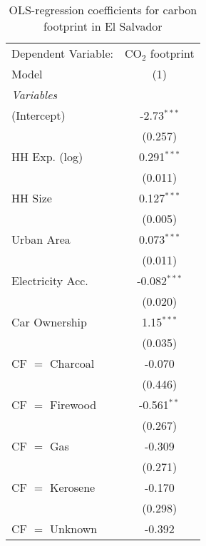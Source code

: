 
\begin{table}[htbp!]
   \centering
   \small
   \begin{adjustbox}{width = 1\textwidth, max height = 0.95\textheight, center}
      \begin{threeparttable}[b]
         \caption{\label{tab:OLS_2_SLV} OLS-regression coefficients for carbon footprint in El Salvador}
         \begin{tabular}{lc}
            \tabularnewline \midrule \midrule
            Dependent Variable: & CO$_{2}$ footprint\\  
            Model               & (1)\\  
            \midrule
            \emph{Variables}\\
            (Intercept)         & -2.73$^{***}$\\   
                                & (0.257)\\   
            HH Exp. (log)       & 0.291$^{***}$\\   
                                & (0.011)\\   
            HH Size             & 0.127$^{***}$\\   
                                & (0.005)\\   
            Urban Area          & 0.073$^{***}$\\   
                                & (0.011)\\   
            Electricity Acc.    & -0.082$^{***}$\\   
                                & (0.020)\\   
            Car Ownership       & 1.15$^{***}$\\   
                                & (0.035)\\   
            CF $=$ Charcoal     & -0.070\\   
                                & (0.446)\\   
            CF $=$ Firewood     & -0.561$^{**}$\\   
                                & (0.267)\\   
            CF $=$ Gas          & -0.309\\   
                                & (0.271)\\   
            CF $=$ Kerosene     & -0.170\\   
                                & (0.298)\\   
            CF $=$ Unknown      & -0.392\\   

\end{tabular}
\end{threeparttable}
\end{adjustbox}
\end{table}
